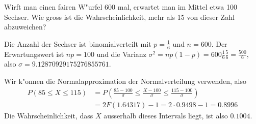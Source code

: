 Wirft man einen fairen W"urfel 600 mal, erwartet man im Mittel
etwa 100 Sechser. Wie gross ist die Wahrscheinlichkeit,
mehr als 15 von dieser Zahl abzuweichen?

\begin{loesung}
Die Anzahl der Sechser ist binomialverteilt mit $p=\frac16$
und $n=600$. Der Erwartungswert ist $np=100$ und die
Varianz $\sigma^2=np(1-p)=600\frac16\frac56=\frac{500}6$,
also $\sigma=9.12870929175276855761$.

Wir k"onnen die Normalapproximation der Normalverteilung verwenden,
also
\begin{align*}
P(85\le X\le 115)
&=
P\left(\frac{85-100}{\sigma}\le\frac{X-100}{\sigma}\le\frac{115-100}{\sigma}\right)
\\
&=
2F(1.64317)-1=2\cdot 0.9498-1=0.8996
\end{align*}
Die Wahrscheinlichkeit, dass $X$ ausserhalb dieses Intervals liegt,
ist also $0.1004$.
\end{loesung}
